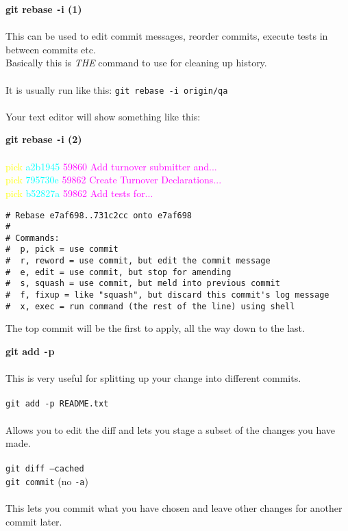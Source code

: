 \documentclass[landscape]{slides}
\begin{document}
\begin{slide}
\textbf{git rebase {\tt-}i (1)}\\
\\
This can be used to edit commit messages, reorder commits, execute tests in
between commits etc.\\
Basically this is {\it THE} command to use for cleaning up history.\\
\\
It is usually run like this: {\tt git rebase -i origin/qa}\\
\\
Your text editor will show something like this:\\
\end{slide}

\begin{slide}
\textbf{git rebase {\tt-}i (2)}\\
\\
\textcolor{yellow}{pick} \textcolor{cyan}{a2b1945} \textcolor{magenta}{59860 Add turnover submitter and...}\\
\textcolor{yellow}{pick} \textcolor{cyan}{795730e} \textcolor{magenta}{59862 Create Turnover Declarations...}\\
\textcolor{yellow}{pick} \textcolor{cyan}{b52827a} \textcolor{magenta}{59862 Add tests for...}\\
\vspace{-15mm}
\begin{verbatim}
# Rebase e7af698..731c2cc onto e7af698
#          
# Commands:            
#  p, pick = use commit                               
#  r, reword = use commit, but edit the commit message
#  e, edit = use commit, but stop for amending          
#  s, squash = use commit, but meld into previous commit          
#  f, fixup = like "squash", but discard this commit's log message
#  x, exec = run command (the rest of the line) using shell
\end{verbatim}

The top commit will be the first to apply, all the way down to the last.
\end{slide}

\begin{slide}
\textbf{git add {\tt-}p}\\
\\
This is very useful for splitting up your change into different commits.\\
\\
{\tt git add -p README.txt}\\
\\
Allows you to edit the diff and lets you stage a subset of the changes you have
made.\\
\\
{\tt git diff --cached}\\
{\tt git commit} (no {\tt -a})\\
\\
This lets you commit what you have chosen and leave other changes for another
commit later.
\end{slide}
\end{document}
